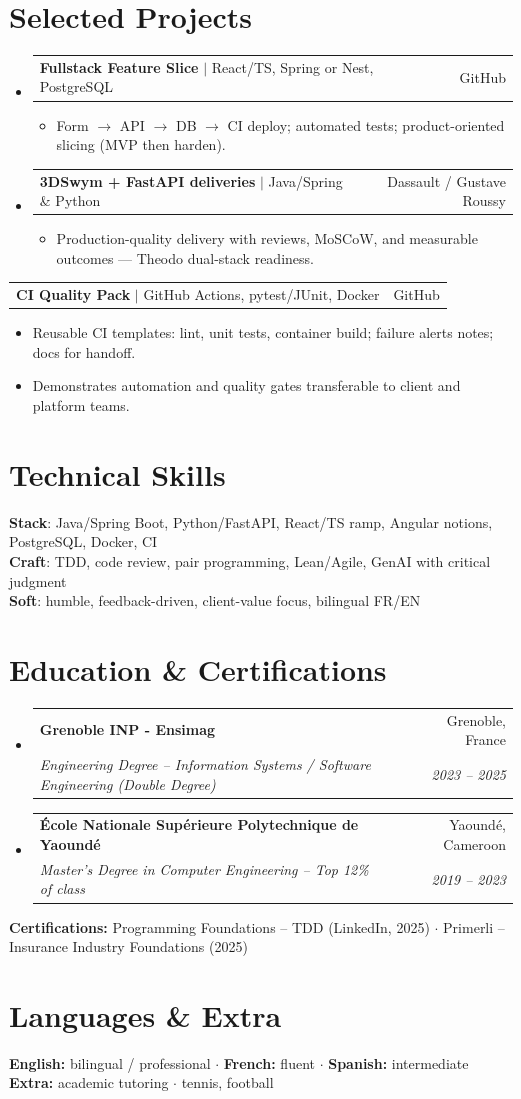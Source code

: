 \documentclass[letterpaper,10.5pt]{article}
\makeatletter
\newcommand{\resumeItem}[1]{\item\small{#1 \vspace{-1.5pt}}}
\newcommand{\resumeSubheading}[4]{\vspace{-1pt}\item\begin{tabular*}{0.97\textwidth}[t]{l@{\extracolsep{\fill}}r}\textbf{#1} & #2 \\\textit{\small#3} & \textit{\small #4} \\\end{tabular*}\vspace{-5pt}}
\newcommand{\resumeProjectHeading}[2]{\item\begin{tabular*}{0.97\textwidth}{l@{\extracolsep{\fill}}r}\small#1 & #2 \\\end{tabular*}\vspace{-5pt}}
\newcommand{\resumeSubHeadingListStart}{\begin{itemize}[leftmargin=0.15in, label={}]}
\newcommand{\resumeSubHeadingListEnd}{\end{itemize}}
\newcommand{\resumeItemListStart}{\begin{itemize}[leftmargin=0.18in]}
\newcommand{\resumeItemListEnd}{\end{itemize}\vspace{-3pt}}
\makeatother
\begin{document}
\section{Selected Projects}
\resumeSubHeadingListStart
  \resumeProjectHeading{\textbf{Fullstack Feature Slice} $|$ React/TS, Spring or Nest, PostgreSQL}{GitHub}
    \resumeItemListStart
      \resumeItem{Form $\rightarrow$ API $\rightarrow$ DB $\rightarrow$ CI deploy; automated tests; product-oriented slicing (MVP then harden).}
    \resumeItemListEnd
  \resumeProjectHeading{\textbf{3DSwym + FastAPI deliveries} $|$ Java/Spring \& Python}{Dassault / Gustave Roussy}
    \resumeItemListStart
      \resumeItem{Production-quality delivery with reviews, MoSCoW, and measurable outcomes --- Theodo dual-stack readiness.}
    \resumeItemListEnd
\resumeSubHeadingListEnd

  \resumeProjectHeading{\textbf{CI Quality Pack} $|$ GitHub Actions, pytest/JUnit, Docker}{GitHub}
    \resumeItemListStart
      \resumeItem{Reusable CI templates: lint, unit tests, container build; failure alerts notes; docs for handoff.}
      \resumeItem{Demonstrates automation and quality gates transferable to client and platform teams.}
    \resumeItemListEnd
\section{Technical Skills}
\begin{itemize}[leftmargin=0.15in, label={}]\small{\item{\textbf{Stack}: Java/Spring Boot, Python/FastAPI, React/TS ramp, Angular notions, PostgreSQL, Docker, CI \\ \textbf{Craft}: TDD, code review, pair programming, Lean/Agile, GenAI with critical judgment \\ \textbf{Soft}: humble, feedback-driven, client-value focus, bilingual FR/EN}}\end{itemize}
\section{Education \& Certifications}
\resumeSubHeadingListStart
  \resumeSubheading{Grenoble INP - Ensimag}{Grenoble, France}{Engineering Degree -- Information Systems / Software Engineering (Double Degree)}{2023 -- 2025}
  \resumeSubheading{\'Ecole Nationale Sup\'erieure Polytechnique de Yaound\'e}{Yaound\'e, Cameroon}{Master's Degree in Computer Engineering -- Top 12\% of class}{2019 -- 2023}
\resumeSubHeadingListEnd
\small{\textbf{Certifications:} Programming Foundations -- TDD (LinkedIn, 2025) $\cdot$ Primerli -- Insurance Industry Foundations (2025)}
\section{Languages \& Extra}
\small{\textbf{English:} bilingual / professional $\cdot$ \textbf{French:} fluent $\cdot$ \textbf{Spanish:} intermediate \\ \textbf{Extra:} academic tutoring $\cdot$ tennis, football}
\end{document}
